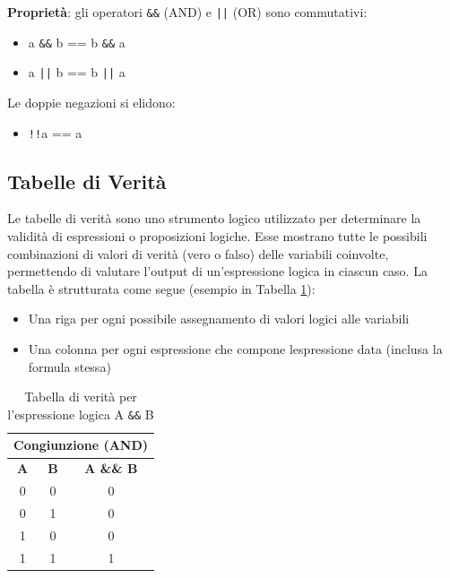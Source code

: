 \documentclass[oneside]{scrbook}
\begin{document}
% 


\textbf{Proprietà}: gli operatori \texttt{\&\&} (AND) e \texttt{||} (OR) sono commutativi:
\begin{itemize}
    \item a \texttt{\&\&} b == b \texttt{\&\&} a
    \item a \texttt{||} b == b \texttt{||} a
\end{itemize}
Le doppie negazioni si elidono:
\begin{itemize}
    \item \texttt{!!}a == a
\end{itemize}

\subsection{Tabelle di Verità}
Le tabelle di verit\`a sono uno strumento logico utilizzato per determinare la validit\`a di espressioni o proposizioni logiche. Esse mostrano tutte le possibili combinazioni di valori di verit\`a (vero o falso) delle variabili coinvolte, permettendo di valutare l'output di un'espressione logica in ciascun caso. La tabella \`e strutturata come segue (esempio in Tabella \ref{tab:logica}):
\begin{itemize}
    \item Una riga per ogni possibile assegnamento di valori logici alle variabili
    \item Una colonna per ogni espressione che compone l\textquotesingle espressione data (inclusa la formula stessa)
\end{itemize}
\begin{table}[h!]
\centering
    \begin{tabular}{|c|c|c|}
        \hline
        \multicolumn{3}{|c|}{\textbf{\large Congiunzione (AND)}} \\
        \hline
        \textbf{A} & \textbf{B} & \textbf{A \&\& B} \\
        \hline
        0 & 0 & 0 \\
        \hline
        0 & 1 & 0 \\
        \hline
        1 & 0 & 0 \\
        \hline
        \rowcolor{yellow!30} 1 & 1 & 1 \\
        \hline
    \end{tabular}
    \caption{Tabella di verit\`a per l'espressione logica A \texttt{\&\&} B}
    \label{tab:logica}
\end{table}
\end{document}
